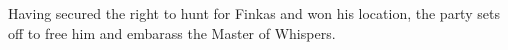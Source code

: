 Having secured the right to hunt for Finkas and won his location, the party sets off to free him and embarass the Master of Whispers.
